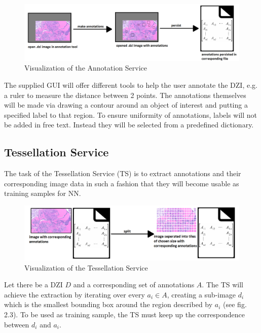 \begin{figure}[H]
	\begin{center}
		\includegraphics[scale=0.25]{img/processChainB.png}
		\caption{Visualization of the Annotation Service}
		\label{fig:fig2.4}
	\end{center}
\end{figure}

The supplied GUI will offer different tools to help the user annotate the DZI, e.g. a ruler to measure the distance between 2 points. The annotations themselves will be made via drawing a contour around an object of interest and putting a specified label to that region. To ensure uniformity of annotations, labels will not be added in free text. Instead they will be selected from a predefined dictionary.


\subsection{Tessellation Service}

The task of the Tessellation Service (TS) is to extract annotations and their corresponding image data in such a fashion that they will become usable as training samples for NN.

\begin{figure}[H]
	\begin{center}
		\includegraphics[scale=0.3]{img/processChainC.png}
		\caption{Visualization of the Tessellation Service}
		\label{fig:fig2.6}
	\end{center}
\end{figure}

Let there be a DZI $D$ and a corresponding set of annotations $A$. The TS will achieve the extraction by iterating over every $a_i \in A$, creating a sub-image $d_i$ which is the smallest bounding box around the region described by $a_i$ (see fig. 2.3). To be used as training sample, the TS must keep up the correspondence between $d_i$ and $a_i$.